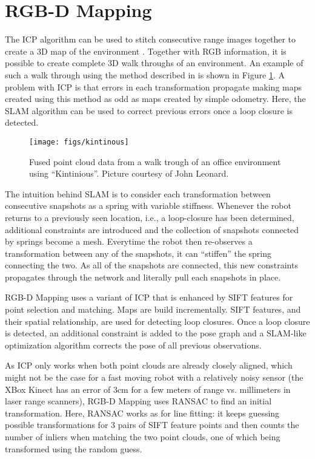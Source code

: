 \documentclass[paper=6.14in:9.21in,pagesize=pdftex,11pt,twoside,openright]{scrbook}
\begin{document}
\section{RGB-D Mapping}
The ICP algorithm can be used to stitch consecutive range images together to create a 3D map of the environment \cite{henry2010rgb}. Together with RGB information, it is possible to create complete 3D walk throughs of an environment. An example of such a walk through using the method described in \cite{whelan2013robust} is shown in Figure \ref{fig:kintinous}.
A problem with ICP is that errors in each transformation propagate making maps created using this method as odd as maps created by simple odometry. Here, the SLAM algorithm can be used to correct previous errors once a loop closure is detected.


\begin{figure}
\centering
\texttt{[image: figs/kintinous]}
\caption{Fused point cloud data from a walk trough of an office environment using ``Kintinious''. Picture courtesy of John Leonard.\label{fig:kintinous}}
\end{figure}

The intuition behind SLAM is to consider each transformation between consecutive snapshots as a spring with variable stiffness. Whenever the robot returns to a previously seen location, i.e., a loop-closure has been determined, additional constraints are introduced and the collection of snapshots connected by springs become a mesh. Everytime the robot then re-observes a transformation between any of the snapshots, it can ``stiffen'' the spring connecting the two. As all of the snapshots are connected, this new constraints propagates through the network and literally pull each snapshots in place.

RGB-D Mapping uses a variant of ICP that is enhanced by SIFT features for point selection and matching. Maps are build incrementally. SIFT features, and their spatial relationship, are used for detecting loop closures. Once a loop closure is detected, an additional constraint is added to the pose graph and a SLAM-like optimization algorithm corrects the pose of all previous observations.

As ICP only works when both point clouds are already closely aligned, which might not be the case for a fast moving robot with a relatively noisy sensor (the XBox Kinect has an error of 3cm for a few meters of range vs. millimeters in laser range scanners), RGB-D Mapping uses RANSAC to find an initial transformation. Here, RANSAC works as for line fitting: it keeps guessing possible transformations for 3 pairs of SIFT feature points and then counts the number of inliers when matching the two point clouds, one of which being transformed using the random guess.



\appendix











\printindex
\end{document}
